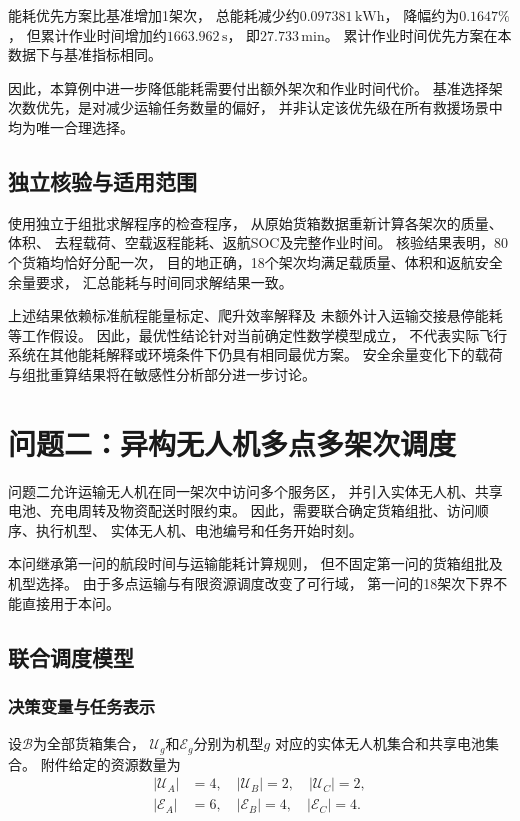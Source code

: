 \documentclass[bwprint]{gmcmthesis}
\begin{document}
能耗优先方案比基准增加1架次，
总能耗减少约$0.097381\,\mathrm{kWh}$，
降幅约为$0.1647\%$，
但累计作业时间增加约$1663.962\,\mathrm{s}$，
即$27.733\,\mathrm{min}$。
累计作业时间优先方案在本数据下与基准指标相同。

因此，本算例中进一步降低能耗需要付出额外架次和作业时间代价。
基准选择架次数优先，是对减少运输任务数量的偏好，
并非认定该优先级在所有救援场景中均为唯一合理选择。

\subsection{独立核验与适用范围}

使用独立于组批求解程序的检查程序，
从原始货箱数据重新计算各架次的质量、体积、
去程载荷、空载返程能耗、返航SOC及完整作业时间。
核验结果表明，80个货箱均恰好分配一次，
目的地正确，18个架次均满足载质量、体积和返航安全余量要求，
汇总能耗与时间同求解结果一致。

上述结果依赖标准航程能量标定、爬升效率解释及
未额外计入运输交接悬停能耗等工作假设。
因此，最优性结论针对当前确定性数学模型成立，
不代表实际飞行系统在其他能耗解释或环境条件下仍具有相同最优方案。
安全余量变化下的载荷与组批重算结果将在敏感性分析部分进一步讨论。


\section{问题二：异构无人机多点多架次调度}

问题二允许运输无人机在同一架次中访问多个服务区，
并引入实体无人机、共享电池、充电周转及物资配送时限约束。
因此，需要联合确定货箱组批、访问顺序、执行机型、
实体无人机、电池编号和任务开始时刻。

本问继承第一问的航段时间与运输能耗计算规则，
但不固定第一问的货箱组批及机型选择。
由于多点运输与有限资源调度改变了可行域，
第一问的18架次下界不能直接用于本问。

\subsection{联合调度模型}

\subsubsection{决策变量与任务表示}

设$\mathcal{B}$为全部货箱集合，
$\mathcal{U}_g$和$\mathcal{E}_g$分别为机型$g$
对应的实体无人机集合和共享电池集合。
附件给定的资源数量为
\begin{equation}
\begin{aligned}
    |\mathcal{U}_A|&=4,\quad
    |\mathcal{U}_B|=2,\quad
    |\mathcal{U}_C|=2,\\
    |\mathcal{E}_A|&=6,\quad
    |\mathcal{E}_B|=4,\quad
    |\mathcal{E}_C|=4.
\end{aligned}
\end{equation}
\end{document}
